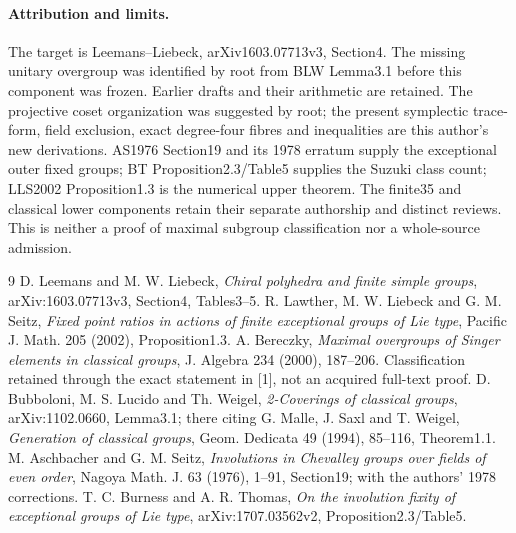 \documentclass[10pt]{article}
\begin{document}
\paragraph{Attribution and limits.}
The target is Leemans--Liebeck, arXiv1603.07713v3, Section4. The missing
unitary overgroup was identified by root from BLW Lemma3.1 before this
component was frozen. Earlier drafts and their arithmetic are retained. The projective
coset organization was suggested by root; the present symplectic trace-form,
field exclusion, exact degree-four fibres and inequalities are this author's
new derivations. AS1976 Section19 and its 1978 erratum supply the exceptional
outer fixed groups; BT Proposition2.3/Table5 supplies the Suzuki class count;
LLS2002 Proposition1.3 is the numerical upper theorem. The finite35 and
classical lower components retain their separate authorship and distinct
reviews. This is neither a proof of maximal subgroup classification nor a
whole-source admission.
\begin{thebibliography}{9}
 D. Leemans and M. W. Liebeck, \emph{Chiral polyhedra and finite
simple groups}, arXiv:1603.07713v3, Section4, Tables3--5.
 R. Lawther, M. W. Liebeck and G. M. Seitz,
\emph{Fixed point ratios in actions of finite exceptional groups of Lie type},
Pacific J. Math. 205 (2002), Proposition1.3.
 A. Bereczky, \emph{Maximal overgroups of Singer elements in
classical groups}, J. Algebra 234 (2000), 187--206. Classification retained
through the exact statement in [1], not an acquired full-text proof.
 D. Bubboloni, M. S. Lucido and Th. Weigel,
\emph{2-Coverings of classical groups}, arXiv:1102.0660, Lemma3.1;
there citing G. Malle, J. Saxl and T. Weigel, \emph{Generation of classical
groups}, Geom. Dedicata 49 (1994), 85--116, Theorem1.1.
 M. Aschbacher and G. M. Seitz, \emph{Involutions in Chevalley
groups over fields of even order}, Nagoya Math. J. 63 (1976), 1--91,
Section19; with the authors' 1978 corrections.
 T. C. Burness and A. R. Thomas, \emph{On the involution fixity
of exceptional groups of Lie type}, arXiv:1707.03562v2, Proposition2.3/Table5.
\end{thebibliography}
\end{document}
